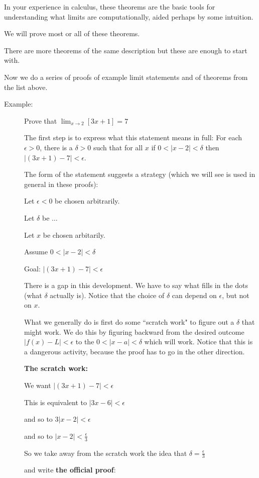 \documentclass[12pt]{article}
\begin{document}
In your experience in calculus, these theorems are the basic tools for understanding what limits are computationally, aided perhaps by some intuition.

We will prove most or all of these theorems.

There are more theorems of the same description but these are enough to start with.

Now we do a series of proofs of example limit statements and of theorems from the list above.

\begin{description}

\item[Example:]  Prove that $\lim_{x\rightarrow 2}[ 3x+1] = 7$

The first step is to express what this statement means in full:  For each $\epsilon>0$, there is a $\delta >0$ such that for all $x$ if $0<|x-2|<\delta$ then $|(3x+1)-7|<\epsilon$.

The form of the statement suggests a strategy (which we will see is used in general in these proofs):

Let $\epsilon <0$ be chosen arbitrarily.

Let $\delta$ be $\ldots$

Let $x$ be chosen arbitarily.

Assume $0<|x-2|<\delta$

Goal:  $|(3x+1)-7|<\epsilon$

There is a gap in this development.  We have to say what fills in the dots (what $\delta$ actually is).  Notice that the choice of $\delta$ can depend on $\epsilon$, but not on $x$.

What we generally do is first do some ``scratch work" to figure out a $\delta$ that might work.  We do this by figuring backward from the desired
outcome $|f(x)-L|<\epsilon$ to the $0<|x-a|<\delta$ which will work.  Notice that this is a dangerous activity, because the proof has to go  in the other direction.

{\bf The scratch work:}

We want $|(3x+1)-7|<\epsilon$

This is equivalent to $|3x-6|<\epsilon$

and so to $3|x-2|<\epsilon$

and so to $|x-2|<\frac{\epsilon}3$

So we take away from the scratch work the idea that $\delta =\frac{\epsilon}3$

and write {\bf the official proof}:


\end{description}
\end{document}
